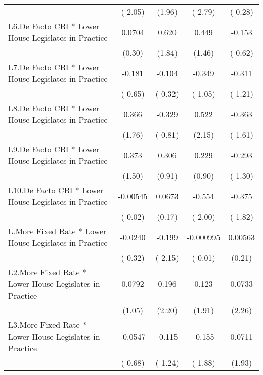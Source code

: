 {\begin{longtable}{l*{4}{c}}
                &  (-2.05)         &   (1.96)         &  (-2.79)         &  (-0.28)         \\
[1em]
L6.De Facto CBI * Lower House Legislates in Practice&   0.0704         &    0.620         &    0.449         &   -0.153         \\
                &   (0.30)         &   (1.84)         &   (1.46)         &  (-0.62)         \\
[1em]
L7.De Facto CBI * Lower House Legislates in Practice&   -0.181         &   -0.104         &   -0.349         &   -0.311         \\
                &  (-0.65)         &  (-0.32)         &  (-1.05)         &  (-1.21)         \\
[1em]
L8.De Facto CBI * Lower House Legislates in Practice&    0.366         &   -0.329         &    0.522\sym{*}  &   -0.363         \\
                &   (1.76)         &  (-0.81)         &   (2.15)         &  (-1.61)         \\
[1em]
L9.De Facto CBI * Lower House Legislates in Practice&    0.373         &    0.306         &    0.229         &   -0.293         \\
                &   (1.50)         &   (0.91)         &   (0.90)         &  (-1.30)         \\
[1em]
L10.De Facto CBI * Lower House Legislates in Practice& -0.00545         &   0.0673         &   -0.554\sym{*}  &   -0.375         \\
                &  (-0.02)         &   (0.17)         &  (-2.00)         &  (-1.82)         \\
[1em]
L.More Fixed Rate * Lower House Legislates in Practice&  -0.0240         &   -0.199\sym{*}  &-0.000995         &  0.00563         \\
                &  (-0.32)         &  (-2.15)         &  (-0.01)         &   (0.21)         \\
[1em]
L2.More Fixed Rate * Lower House Legislates in Practice&   0.0792         &    0.196\sym{*}  &    0.123         &   0.0733\sym{*}  \\
                &   (1.05)         &   (2.20)         &   (1.91)         &   (2.26)         \\
[1em]
L3.More Fixed Rate * Lower House Legislates in Practice&  -0.0547         &   -0.115         &   -0.155         &   0.0711         \\
                &  (-0.68)         &  (-1.24)         &  (-1.88)         &   (1.93)         \\

\end{longtable}}
